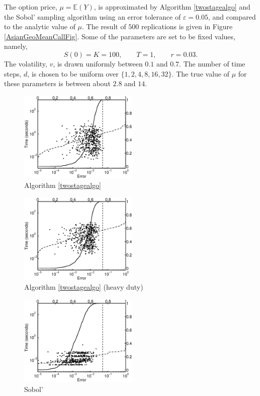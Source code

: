 \documentclass[graybox]{svmult}
\newcommand\e{\mathbb{E}}
\begin{document}
The option price, $\mu=\e(Y)$, is approximated by Algorithm \ref{twostagealgo} and the Sobol' sampling algorithm using an error tolerance of $\varepsilon=0.05$, and compared to the analytic value of $\mu$.  The result of $500$ replications is given in Figure \ref{AsianGeoMeanCallFig}.  Some of the parameters are set to be fixed values, namely,
\[
S(0)=K=100, \qquad T=1, \qquad r=0.03.
\]
The volatility, $v$, is drawn uniformly between $0.1$ and $0.7$.  The number of time steps, $d$, is chosen to be uniform over $\{1, 2, 4, 8, 16, 32\}$.  The true value of $\mu$ for these parameters is between about $2.8$ and $14$.

\begin{figure}
\centering
\begin{minipage}{5.7cm} \centering \includegraphics[width=5.7cm]{geomeaniidErrTime.eps} \\ Algorithm \ref{twostagealgo} \end{minipage}
\begin{minipage}{5.7cm} \centering \includegraphics[width=5.7cm]{geomeaniidheavyErrTime.eps} \\ Algorithm \ref{twostagealgo} (heavy duty)\end{minipage}
\begin{minipage}{5.7cm} \centering \includegraphics[width=5.7cm]{geomeanSobolErrTime.eps} \\ Sobol' \end{minipage}

\end{figure}
\end{document}
